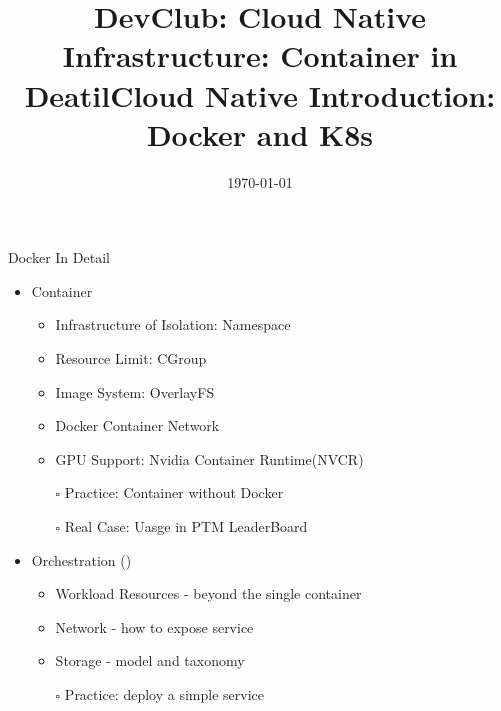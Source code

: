 \documentclass{beamer}
\title{DevClub: Cloud Native Infrastructure: Container in Deatil}
\date{\today}
\title{Cloud Native Introduction: Docker and K8s}
\begin{document}
    \maketitle
    \begin{frame}{Docker In Detail}
        \begin{itemize}

            \item Container
            \begin{itemize}
                \item Infrastructure of Isolation: Namespace 
                \item Resource Limit: CGroup
                \item Image System:  OverlayFS
                \item Docker Container Network
                \item GPU Support: Nvidia Container Runtime(NVCR)
                \item[$\square$] Practice: Container without Docker
                \item[$\square$] Real Case: Uasge in PTM LeaderBoard
            \end{itemize}

            \item Orchestration ()
            \begin{itemize}
                \item Workload Resources - beyond the single container
                \item Network - how to expose service
                \item Storage - model and taxonomy
                \item[$\square$] Practice: deploy a simple service
            \end{itemize}

        \end{itemize}
    \end{frame}
    
    
    
    
    
\end{document}
